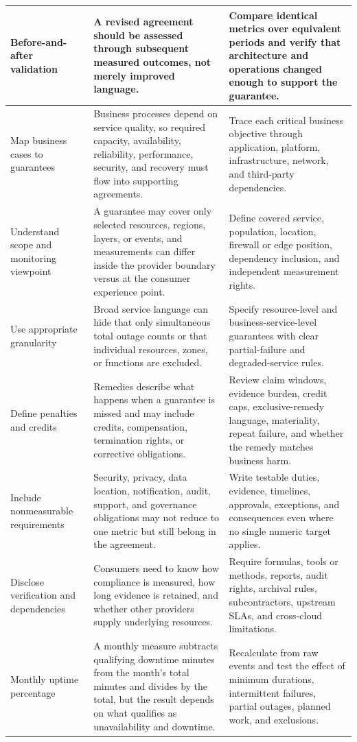 \documentclass[11pt]{article}
\begin{document}
\begin{longtable}{@{}>{\RaggedRight\arraybackslash}p{}>{\RaggedRight\arraybackslash}p{}>{\RaggedRight\arraybackslash}p{}@{}}
Before-and-after validation & A revised agreement should be assessed through subsequent measured outcomes, not merely improved language. & Compare identical metrics over equivalent periods and verify that architecture and operations changed enough to support the guarantee. \\\midrule
Map business cases to guarantees & Business processes depend on service quality, so required capacity, availability, reliability, performance, security, and recovery must flow into supporting agreements. & Trace each critical business objective through application, platform, infrastructure, network, and third-party dependencies. \\\midrule
Understand scope and monitoring viewpoint & A guarantee may cover only selected resources, regions, layers, or events, and measurements can differ inside the provider boundary versus at the consumer experience point. & Define covered service, population, location, firewall or edge position, dependency inclusion, and independent measurement rights. \\\midrule
Use appropriate granularity & Broad service language can hide that only simultaneous total outage counts or that individual resources, zones, or functions are excluded. & Specify resource-level and business-service-level guarantees with clear partial-failure and degraded-service rules. \\\midrule
Define penalties and credits & Remedies describe what happens when a guarantee is missed and may include credits, compensation, termination rights, or corrective obligations. & Review claim windows, evidence burden, credit caps, exclusive-remedy language, materiality, repeat failure, and whether the remedy matches business harm. \\\midrule
Include nonmeasurable requirements & Security, privacy, data location, notification, audit, support, and governance obligations may not reduce to one metric but still belong in the agreement. & Write testable duties, evidence, timelines, approvals, exceptions, and consequences even where no single numeric target applies. \\\midrule
Disclose verification and dependencies & Consumers need to know how compliance is measured, how long evidence is retained, and whether other providers supply underlying resources. & Require formulas, tools or methods, reports, audit rights, archival rules, subcontractors, upstream SLAs, and cross-cloud limitations. \\\midrule
Monthly uptime percentage & A monthly measure subtracts qualifying downtime minutes from the month's total minutes and divides by the total, but the result depends on what qualifies as unavailability and downtime. & Recalculate from raw events and test the effect of minimum durations, intermittent failures, partial outages, planned work, and exclusions. \\\midrule

\end{longtable}
\end{document}
